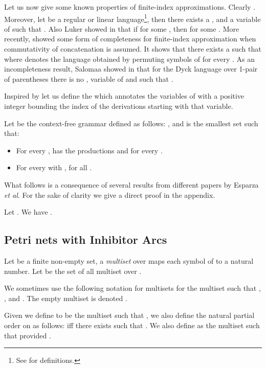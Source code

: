 \documentclass{fsttcs}
\begin{document}
Let us now give some known properties of finite-index approximations.
Clearly .  Moreover, let  be
a regular or linear language\footnote{See \cite{HMU06} for definitions.}, then
there exists a  , and a variable  of  such that
.  Also Luker showed in \cite{Luker78} that if  for some , then 
for some .  More recently, \cite{EKL08:icalp,gmm10} showed some
form of completeness for finite-index approximation when commutativity of
concatenation is assumed. It shows that there exists a  such that
 where  denotes the language
obtained by permuting symbols of  for every .  As an
incompleteness result, Salomaa showed in \cite{Salomaa1969} that for the Dyck
language  over 1-pair of parentheses there is no  ,
variable  of  and  such that
. 

Inspired by \cite{egkl11-ipl,EKL10:JACM,EKL08:icalp} let us define the
  which annotates the variables of 
with a positive integer bounding the index of the derivations starting with
that variable. 

\begin{definition}
Let
  be the  context-free grammar defined as follows:  , and   is the smallest  set such that:
\begin{itemize}
\item For every , 
has the productions  and  for every
.
\item For every  with  , 
 for all
.
\end{itemize}
\label{def:cfgbounded}
\end{definition}

What follows is a consequence of several results from different papers by
Esparza \textit{et al}. For the sake of clarity we give a direct proof in the appendix.
{\begin{lemma}
	\label{lem1} Let . We have .
\end{lemma}
}


\subsection{Petri nets with Inhibitor Arcs}

Let  be a finite non-empty set, a \emph{multiset}  over  maps each symbol of  to a natural
number.  Let  be the set of all multiset over .

We sometimes use the following notation for multisets
 for the multiset
 such that ,
, and . The empty multiset is denoted
.  

Given  we define  to be the multiset such that , we also define the natural partial order
 on  as follows:  if{}f there
exists  such that
.  We also define
 as the multiset such that
 provided .
\end{document}
